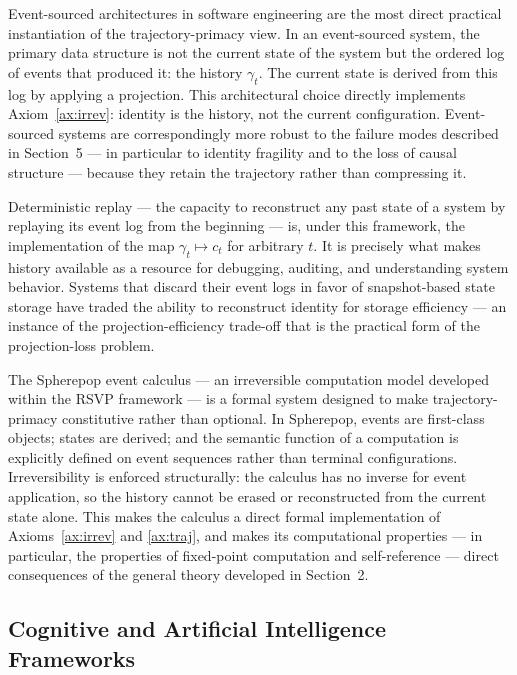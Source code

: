 \documentclass[12pt, twoside]{article}
\theoremstyle{plain}
\theoremstyle{definition}
\theoremstyle{remark}
\begin{document}
Event-sourced architectures in software engineering are the most direct
practical instantiation of the trajectory-primacy view.
In an event-sourced system, the primary data structure is not the current
state of the system but the ordered log of events that produced it:
the history $\gamma_t$.
The current state is derived from this log by applying a projection.
This architectural choice directly implements Axiom~\ref{ax:irrev}:
identity is the history, not the current configuration.
Event-sourced systems are correspondingly more robust to the failure
modes described in Section~5 — in particular to identity fragility
and to the loss of causal structure — because they retain the
trajectory rather than compressing it.

Deterministic replay — the capacity to reconstruct any past state of
a system by replaying its event log from the beginning — is, under
this framework, the implementation of the map $\gamma_t \mapsto c_t$
for arbitrary $t$.
It is precisely what makes history available as a resource for
debugging, auditing, and understanding system behavior.
Systems that discard their event logs in favor of snapshot-based
state storage have traded the ability to reconstruct identity
for storage efficiency — an instance of the projection-efficiency
trade-off that is the practical form of the projection-loss problem.

The Spherepop event calculus — an irreversible computation model
developed within the RSVP framework — is a formal system designed
to make trajectory-primacy constitutive rather than optional.
In Spherepop, events are first-class objects; states are derived;
and the semantic function of a computation is explicitly defined
on event sequences rather than terminal configurations.
Irreversibility is enforced structurally: the calculus has no inverse
for event application, so the history cannot be erased or
reconstructed from the current state alone.
This makes the calculus a direct formal implementation of
Axioms~\ref{ax:irrev} and \ref{ax:traj},
and makes its computational properties — in particular,
the properties of fixed-point computation and self-reference —
direct consequences of the general theory developed in Section~2.

\subsection{Cognitive and Artificial Intelligence Frameworks}
\end{document}
